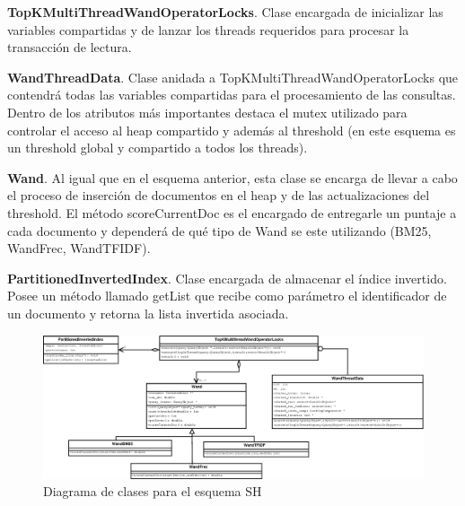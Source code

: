\begin{list}{}{}
	\item \textbf{TopKMultiThreadWandOperatorLocks}. Clase encargada de inicializar las variables compartidas y de lanzar los threads requeridos para procesar la transacción de lectura.
	
	\item \textbf{WandThreadData}. Clase anidada a TopKMultiThreadWandOperatorLocks que contendrá todas las variables compartidas para el procesamiento de las consultas. Dentro de los atributos más importantes destaca el mutex utilizado para controlar el acceso al heap compartido y además al threshold (en este esquema es un threshold global y compartido a todos los threads).
	
	\item \textbf{Wand}. Al igual que en el esquema anterior, esta clase se encarga de llevar a cabo el proceso de inserción de documentos en el heap y de las actualizaciones del threshold. El método scoreCurrentDoc es el encargado de entregarle un puntaje a cada documento y dependerá de qué tipo de Wand se este utilizando (BM25, WandFrec, WandTFIDF). 

	\item \textbf{PartitionedInvertedIndex}. Clase encargada de almacenar el índice invertido. Posee un método llamado getList que recibe como parámetro el identificador de un documento y retorna la lista invertida asociada. 

\end{list}

\begin{figure}
\centering
\includegraphics[scale=.75]{images/TopKMultiThreadWandOperatorLocks.eps}
\caption{Diagrama de clases para el esquema SH}
\label{fig:TopKMultiThreadWandOperatorLocks}
\end{figure}



